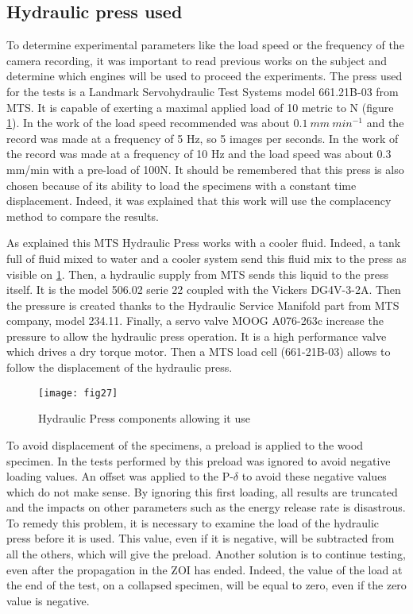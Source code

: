 \subsection{Hydraulic press used}

To determine experimental parameters like the load speed or the frequency of the camera recording, it was important to read previous works on the subject and determine which engines will be used to proceed the experiments. The press used for the tests is a Landmark Servohydraulic Test Systems model 661.21B-03  from MTS. It is capable of exerting a maximal applied load of 10 metric to N (figure \ref{fig:fig27}).
In the work of \cite{Ostapska2021} the load speed recommended was about $0.1\ mm\ {min}^{-1}$ and the record was made at a frequency of 5 Hz, so 5 images per seconds. In the work of \cite{Mambili2018} the record was made at a frequency of 10 Hz and the load speed was about 0.3 mm/min with a pre-load of 100N. It should be remembered that this press is also chosen because of its ability to load the specimens with a constant time displacement. Indeed, it was explained that this work will use the complacency method to compare the results.

As explained \cite{MALFAIT2021}  this MTS Hydraulic Press works with a cooler fluid. Indeed, a tank full of fluid mixed to water and a cooler system send this fluid mix to the press as visible on \ref{fig:fig27}. Then, a hydraulic supply from MTS sends this liquid to the press itself. It is the model 506.02 serie 22 coupled with the Vickers DG4V-3-2A. Then the pressure is created thanks to the Hydraulic Service Manifold part from MTS company, model 234.11. Finally, a servo valve MOOG A076-263c increase the pressure to allow the hydraulic press operation. It is a high performance valve which drives a dry torque motor. Then a MTS load cell (661-21B-03) allows to follow the displacement of the hydraulic press.


\begin{figure}[htp]
	\centering
	\texttt{[image: fig27]}
	\caption{Hydraulic Press components allowing it use \cite{MALFAIT2021}}
	\label{fig:fig27}
\end{figure}

To avoid displacement of the specimens, a preload is applied to the wood specimen. In the tests performed by \cite{MALFAIT2021} this preload was ignored to avoid negative loading values. An offset was applied to the P-$\delta$ to avoid these negative values which do not make sense. By ignoring this first loading, all results are truncated and the impacts on other parameters such as the energy release rate is disastrous. 
To remedy this problem, it is necessary to examine the load of the hydraulic press before it is used. This value, even if it is negative, will be subtracted from all the others, which will give the preload. Another solution is to continue testing, even after the propagation in the ZOI has ended. Indeed, the value of the load at the end of the test, on a collapsed specimen, will be equal to zero, even if the zero value is negative.

